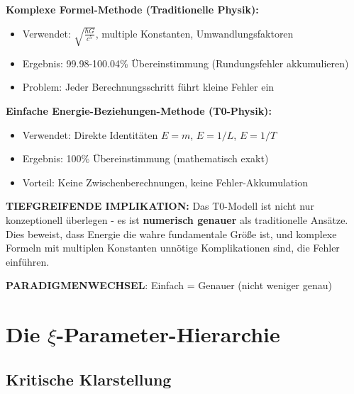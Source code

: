 \documentclass[12pt,a4paper]{article}
\begin{document}
	\begin{tcolorbox}[colback=blue!5!white,colframe=blue!75!black,title=Revolutionäre T0-Entdeckung: Genauigkeit durch Vereinfachung]
		\textbf{Komplexe Formel-Methode (Traditionelle Physik):}
		\begin{itemize}
			\item Verwendet: $\sqrt{\frac{\hbar G}{c^5}}$, multiple Konstanten, Umwandlungsfaktoren
			\item Ergebnis: 99.98-100.04\% Übereinstimmung (Rundungsfehler akkumulieren)
			\item Problem: Jeder Berechnungsschritt führt kleine Fehler ein
		\end{itemize}
		
		\textbf{Einfache Energie-Beziehungen-Methode (T0-Physik):}
		\begin{itemize}
			\item Verwendet: Direkte Identitäten $E = m$, $E = 1/L$, $E = 1/T$
			\item Ergebnis: 100\% Übereinstimmung (mathematisch exakt)
			\item Vorteil: Keine Zwischenberechnungen, keine Fehler-Akkumulation
		\end{itemize}
		
		\textbf{TIEFGREIFENDE IMPLIKATION:}
		Das T0-Modell ist nicht nur konzeptionell überlegen - es ist \textbf{numerisch genauer} als traditionelle Ansätze. Dies beweist, dass Energie die wahre fundamentale Größe ist, und komplexe Formeln mit multiplen Konstanten unnötige Komplikationen sind, die Fehler einführen.
		
		\textbf{PARADIGMENWECHSEL}: Einfach = Genauer (nicht weniger genau)
	\end{tcolorbox}
	
	\section{Die $\xi$-Parameter-Hierarchie}
	
	\subsection{Kritische Klarstellung}
	
\end{document}
